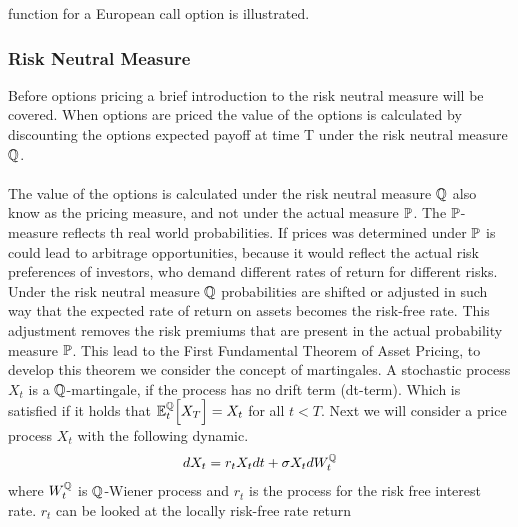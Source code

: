 function for a European call option is illustrated.
\begin{center}
\end{center}
\subsubsection{Risk Neutral Measure}
Before options pricing a brief introduction to the risk neutral measure will be covered.
When options are priced the value of the options is calculated by discounting 
the options expected payoff at time T under the risk neutral measure $\mathbb{Q}$. 
\\\\
The value of the options is calculated under the risk neutral measure $\mathbb{Q}$ also know as the pricing measure, and 
not under the actual measure $\mathbb{P}$. The $\mathbb{P}$- measure reflects th real world probabilities. If prices was determined 
under $\mathbb{P}$ is could lead to arbitrage opportunities, because it would reflect the actual risk preferences of
investors, who demand different rates of return for different risks. Under the risk neutral measure $\mathbb{Q}$  
probabilities are shifted or adjusted in such way that the expected rate of return on assets becomes the risk-free rate. 
This adjustment removes the risk premiums that are present in the actual probability measure $\mathbb{P}$.
This lead to the First Fundamental Theorem of Asset Pricing, to develop this theorem we consider 
the concept of martingales. 
A stochastic process $X_t$ is a $\mathbb{Q}$-martingale, if the process has no drift term (dt-term). Which is satisfied if it holds that
$\mathbb{E}_{t}^{\mathbb{Q}}\Big[X_T\Big] = X_t$ for all $t<T$. Next we will consider a price process $X_t$ with the following dynamic.
\begin{align}
    d X_t = r_t X_t dt + \sigma X_t d W_{t}^{\mathbb{Q}}
    \label{price_process}
\end{align}
where $W_{t}^{\mathbb{Q}}$ is $\mathbb{Q}$-Wiener process and  $r_t$ is the process for the risk free interest rate. $r_t$ can be looked at the locally risk-free rate return 

